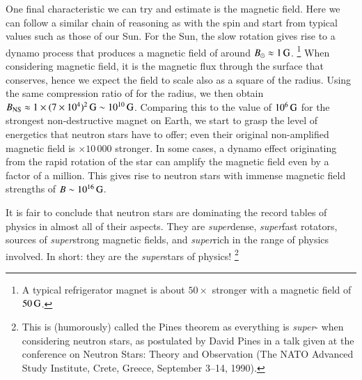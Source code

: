 One final characteristic we can try and estimate is the magnetic field. %
Here we can follow a similar chain of reasoning as with the spin and start from typical values such as those of our Sun.
For the Sun, the slow rotation gives rise to a dynamo process that produces a magnetic field of around $B_{\odot} \approx 1\, \mathrm{G}$.%
\footnote{A typical refrigerator magnet is about $50\times$ stronger with a magnetic field of $50\, \mathrm{G}$.}
When considering magnetic field, it is the magnetic flux through the surface that conserves, hence we expect the field to scale also as a square of the radius.
Using the same compression ratio of  for the radius, we then obtain $B_{\mathrm{NS}} \approx 1 \times (7 \times 10^{4})^2 \, \mathrm{G} \sim 10^{10} \, \mathrm{G}$.
Comparing this to the value of $10^6\, \mathrm{G}$ for the strongest non-destructive magnet on Earth, we start to grasp the level of energetics that neutron stars have to offer; even their original non-amplified magnetic field is $\times 10\,000$ stronger.
In some cases, a dynamo effect originating from the rapid rotation of the star can amplify the magnetic field even by a factor of a million. 
This gives rise to neutron stars with immense magnetic field strengths of $B \sim 10^{16} \, \mathrm{G}$.

It is fair to conclude that neutron stars are dominating the record tables of physics in almost all of their aspects.
They are \emph{super}dense, \emph{super}fast rotators, sources of \emph{super}strong magnetic fields, and \emph{super}rich in the range of physics involved.
In short: they are the \emph{super}stars of physics!%
\footnote{
    This is (humorously) called the Pines theorem as everything is \emph{super}- when considering neutron stars, as postulated by David Pines in a talk given at the conference on Neutron Stars: Theory and Observation (The NATO Advanced Study Institute, Crete, Greece, September 3–14, 1990).
}
